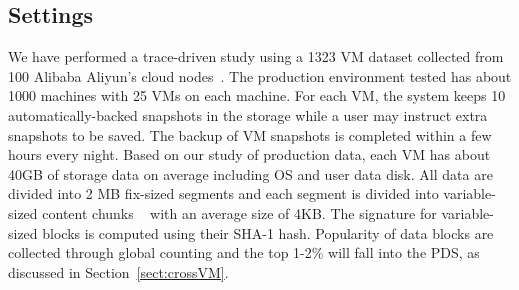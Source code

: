 \subsection{Settings}
We have performed a trace-driven study using  a 1323 VM dataset  collected from 
100 Alibaba Aliyun's cloud nodes~\cite{WeiZhangIEEE}.
The production environment tested has  about 1000 machines with 25 VMs on each machine.
For each VM, the system keeps 10 automatically-backed snapshots in the storage while
a user may instruct extra snapshots to be saved.
The backup of VM snapshots is completed within a few  hours every night.
Based on our study of production  data,  each VM has about  40GB of storage  data  on average
including OS and user data disk.
All data are divided into 2 MB fix-sized segments and each segment is divided into 
variable-sized content chunks ~\cite{similar94,rabin81} with an average size of 4KB.
The signature for variable-sized blocks is computed using their SHA-1 hash. 
Popularity of data blocks are collected through global counting 
and the top 1-2\% will fall into the PDS, as discussed in Section~\ref{sect:crossVM}.



